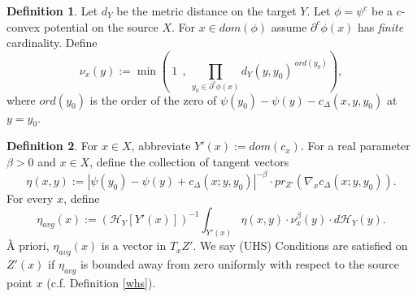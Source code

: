 \documentclass[12pt]{amsart}
\theoremstyle{definition}
\newtheorem{dfn}{Definition}
\theoremstyle{remark}
\newcommand{\bR}{\mathbb{R}}
\newcommand{\del}{\partial}
\newcommand{\cd}{c_\Delta}
\begin{document}
\begin{dfn}\label{order}
Let $d_Y$ be the metric distance on the target $Y$. Let $\phi=\psi^c$ be a $c$-convex potential on the source $X$. For $x\in dom(\phi)$ assume $\del^c \phi(x)$ has \emph{finite} cardinality. Define \begin{equation}\label{nuorder}
\nu_x(y):=\min(~1~~,~\prod_{y_0 \in \del^c \phi(x)} d_Y(y,y_0)^{~ord(y_0)}),\end{equation} where $ord(y_0)$ is the order of the zero of $\psi(y_0)-\psi(y) -\cd(x,y,y_0)$ at $y=y_0$. 
\end{dfn}




















\begin{dfn}
For $x\in X$, abbreviate $Y'(x):=dom(c_x)$. For a real parameter $\beta>0$ and $x\in X$, define the collection of tangent vectors $$ \eta(x, y):=|\psi(y_0)-\psi(y)+\cd(x; y, y_0)|^{-\beta} \cdot pr_{Z'}( \nabla_x \cd(x; y, y_0)). $$ For every $x$, define 
\begin{equation}
\eta_{avg}(x):=(\mathscr{H}_Y[Y'(x)])^{-1} \int_{Y'(x)} \eta(x,y) \cdot \nu^\beta_x (y) \cdot d\mathscr{H}_Y(y). 
\label{avg2}\end{equation} \`A priori, $\eta_{avg}(x)$ is a vector in $T_x Z'$. We say (UHS) Conditions are satisfied on $Z'(x)$ if $\eta_{avg}$ is bounded away from zero uniformly with respect to the source point $x$ (c.f. Definition \ref{whs}).
\end{dfn}

\end{document}
